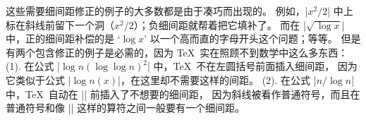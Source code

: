 \ddanger \1这些需要细间距修正的例子的大多数都是由于凑巧而出现的。
例如，|$x^2/2$| 中上标在斜线前留下一个洞（$x^2/2$）；负细间距就帮着把它填补了。
而在 |$\sqrt{\,\log x}$| 中，正的细间距补偿的是 `$\log x$'
以一个高而直的字母开头这个问题；等等。
但是有两个包含修正的例子是必需的，因为 \TeX\ 实在照顾不到数学中这么多东西：%
(1). 在公式 |$\log n(\log\log n)^2$| 中，\TeX\ 不在左圆括号前面插入细间距，
因为它类似于公式 |$\log n(x)$|，在这里却不需要这样的间距。
(2). 在公式 |$n/\log n$| 中，\TeX\ 自动在 |\log| 前插入了不想要的细间距，
因为斜线被看作普通符号，而且在普通符号和像 |\log|
这样的算符之间一般要有一个细间距。

